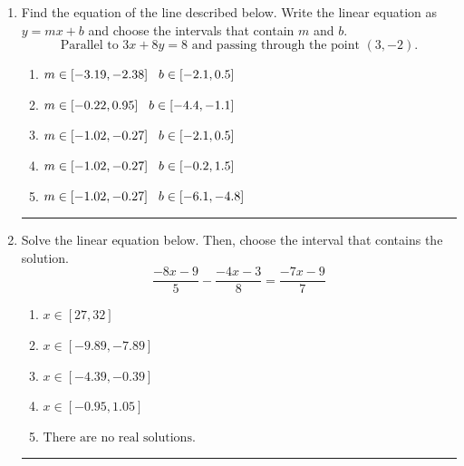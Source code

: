 \documentclass[14pt]{extbook}
\newcommand{\litem}[1]{\item#1\hspace*{-1cm}\rule{\textwidth}{0.4pt}}
\begin{document}
\begin{enumerate}
{\begin{enumerate}[label=\Alph*.]
\end{enumerate} }
\litem{
Find the equation of the line described below. Write the linear equation as $ y=mx+b $ and choose the intervals that contain $m$ and $b$.\[ \text{Parallel to } 3 x + 8 y = 8 \text{ and passing through the point } (3, -2). \]\begin{enumerate}[label=\Alph*.]
\item \( m \in [-3.19, -2.38] \hspace*{3mm} b \in [-2.1, 0.5] \)
\item \( m \in [-0.22, 0.95] \hspace*{3mm} b \in [-4.4, -1.1] \)
\item \( m \in [-1.02, -0.27] \hspace*{3mm} b \in [-2.1, 0.5] \)
\item \( m \in [-1.02, -0.27] \hspace*{3mm} b \in [-0.2, 1.5] \)
\item \( m \in [-1.02, -0.27] \hspace*{3mm} b \in [-6.1, -4.8] \)

\end{enumerate} }
\litem{
Solve the linear equation below. Then, choose the interval that contains the solution.\[ \frac{-8x -9}{5} - \frac{-4x -3}{8} = \frac{-7x -9}{7} \]\begin{enumerate}[label=\Alph*.]
\item \( x \in [27, 32] \)
\item \( x \in [-9.89, -7.89] \)
\item \( x \in [-4.39, -0.39] \)
\item \( x \in [-0.95, 1.05] \)
\item \( \text{There are no real solutions.} \)

\end{enumerate} }
\end{enumerate}
\end{document}
